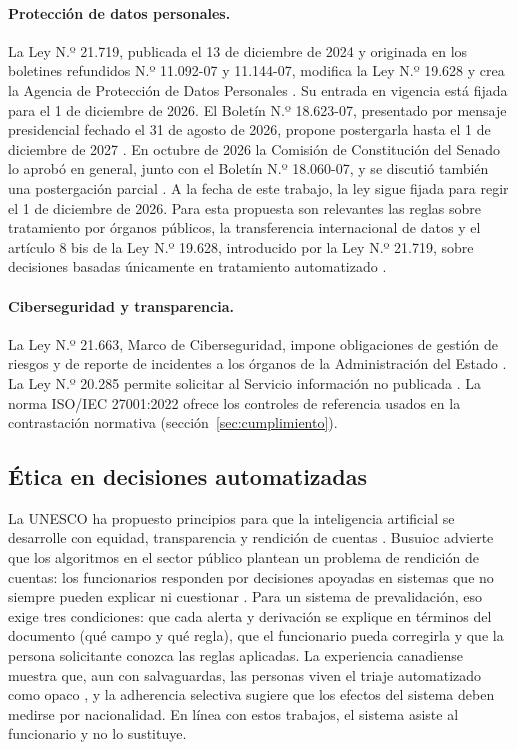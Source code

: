 \documentclass[11pt,a4paper]{article}
\begin{document}
\paragraph{Protección de datos personales.} La Ley N.º 21.719, publicada el 13 de diciembre de 2024 y originada en los boletines refundidos N.º 11.092-07 y 11.144-07, modifica la Ley N.º 19.628 \cite{ley19628} y crea la Agencia de Protección de Datos Personales \cite{ley21719,bcn21719}. Su entrada en vigencia está fijada para el 1 de diciembre de 2026. El Boletín N.º 18.623-07, presentado por mensaje presidencial fechado el 31 de agosto de 2026, propone postergarla hasta el 1 de diciembre de 2027 \cite{cariola2026,parlamento2026}. En octubre de 2026 la Comisión de Constitución del Senado lo aprobó en general, junto con el Boletín N.º 18.060-07, y se discutió también una postergación parcial \cite{jdf2026}. A la fecha de este trabajo, la ley sigue fijada para regir el 1 de diciembre de 2026. Para esta propuesta son relevantes las reglas sobre tratamiento por órganos públicos, la transferencia internacional de datos y el artículo 8 bis de la Ley N.º 19.628, introducido por la Ley N.º 21.719, sobre decisiones basadas únicamente en tratamiento automatizado \cite{ley21719}.

\paragraph{Ciberseguridad y transparencia.} La Ley N.º 21.663, Marco de Ciberseguridad, impone obligaciones de gestión de riesgos y de reporte de incidentes a los órganos de la Administración del Estado \cite{ley21663}. La Ley N.º 20.285 permite solicitar al Servicio información no publicada \cite{ley20285}. La norma ISO/IEC 27001:2022 \cite{iso27001} ofrece los controles de referencia usados en la contrastación normativa (sección~\ref{sec:cumplimiento}).

\subsection{Ética en decisiones automatizadas}
La UNESCO ha propuesto principios para que la inteligencia artificial se desarrolle con equidad, transparencia y rendición de cuentas \cite{unesco2021}. Busuioc advierte que los algoritmos en el sector público plantean un problema de rendición de cuentas: los funcionarios responden por decisiones apoyadas en sistemas que no siempre pueden explicar ni cuestionar \cite{busuioc2021}. Para un sistema de prevalidación, eso exige tres condiciones: que cada alerta y derivación se explique en términos del documento (qué campo y qué regla), que el funcionario pueda corregirla y que la persona solicitante conozca las reglas aplicadas. La experiencia canadiense muestra que, aun con salvaguardas, las personas viven el triaje automatizado como opaco \cite{dasd2026}, y la adherencia selectiva \cite{alonbarkat2023} sugiere que los efectos del sistema deben medirse por nacionalidad. En línea con estos trabajos, el sistema asiste al funcionario y no lo sustituye.
\end{document}
